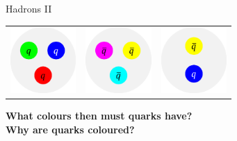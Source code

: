 \begin{frame}{Hadrons II}
\begin{table}[]
\begin{tabular}{ccc}
         \includegraphics[width=2.5cm]{Figures Lecture on Hadrons/Baryon_scheme.png} &\includegraphics[width=2.5cm]{Figures Lecture on Hadrons/Antibaryon_scheme.png} &\includegraphics[width=2.5cm]{Figures Lecture on Hadrons/Meson_scheme.png} 
    \end{tabular}
    \label{tab:my_label}
\end{table}
  \end{frame}

\begin{frame}
\textbf{What colours then must quarks have? }\\ \textbf{Why are quarks coloured?}
\end{frame}


